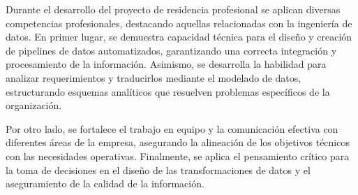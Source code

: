 Durante el desarrollo del proyecto de residencia profesional se aplican diversas competencias profesionales, destacando aquellas relacionadas con la ingeniería de datos. En primer lugar, se demuestra capacidad técnica para el diseño y creación de pipelines de datos automatizados, garantizando una correcta integración y procesamiento de la información. Asimismo, se desarrolla la habilidad para analizar requerimientos y traducirlos mediante el modelado de datos, estructurando esquemas analíticos que resuelven problemas específicos de la organización.

Por otro lado, se fortalece el trabajo en equipo y la comunicación efectiva con diferentes áreas de la empresa, asegurando la alineación de los objetivos técnicos con las necesidades operativas. Finalmente, se aplica el pensamiento crítico para la toma de decisiones en el diseño de las transformaciones de datos y el aseguramiento de la calidad de la información.
